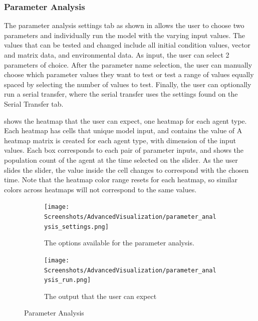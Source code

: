\subsubsection{Parameter Analysis}
\label{sec:parameter_analysis}
The parameter analysis settings tab as shown in  allows the user to choose two parameters and individually run the model with the varying input values.
The values that can be tested and changed include all initial condition values, vector and matrix data, and environmental data.
As input, the user can select 2 parameters of choice.
After the parameter name selection, the user can manually choose which parameter values they want to test or test a range of values equally spaced by selecting the number of values to test.
Finally, the user can optionally run a serial transfer, where the serial transfer uses the settings found on the Serial Transfer tab. \newline

 shows the heatmap that the user can expect, one heatmap for each agent type.
Each heatmap has cells that unique model input, and contains the value of
A heatmap matrix is created for each agent type, with dimension of the input values.
Each box corresponds to each pair of parameter inputs, and shows the population count of the agent at the time selected on the slider. 
As the user slides the slider, the value inside the cell changes to correspond with the chosen time. 
Note that the heatmap color range resets for each heatmap, so similar colors across heatmaps will not correspond to the same values.

\begin{figure}[h!]
    \centering
    \begin{subfigure}{0.49\linewidth}
        \centering
        \vspace*{\fill}
        \texttt{[image: Screenshots/AdvancedVisualization/parameter\_analysis\_settings.png]}
        \caption{
            The options available for the parameter analysis. 
        }
        \label{fig:ss:av:parameter_analysis_settings}
        \vspace*{\fill}
    \end{subfigure}
    \hfill
    \begin{subfigure}{0.49\linewidth}
        \centering
        \vspace*{\fill}
        \texttt{[image: Screenshots/AdvancedVisualization/parameter\_analysis\_run.png]}
        \caption{
            The output that the user can expect
        }
        \label{fig:ss:av:parameter_analysis_run}
        \vspace*{\fill}
    \end{subfigure}
    \caption{Parameter Analysis}
\end{figure}


